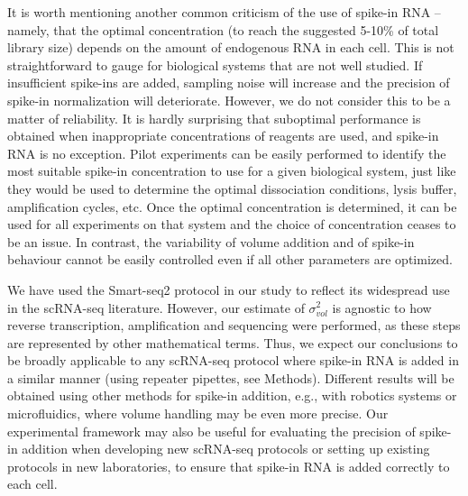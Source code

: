 \documentclass{article}
\begin{document}
It is worth mentioning another common criticism of the use of spike-in RNA -- namely, that the optimal concentration (to reach the suggested 5-10\% of total library size) depends on the amount of endogenous RNA in each cell.
This is not straightforward to gauge for biological systems that are not well studied.
If insufficient spike-ins are added, sampling noise will increase and the precision of spike-in normalization will deteriorate.
However, we do not consider this to be a matter of reliability.
It is hardly surprising that suboptimal performance is obtained when inappropriate concentrations of reagents are used, and spike-in RNA is no exception.
Pilot experiments can be easily performed to identify the most suitable spike-in concentration to use for a given biological system, just like they would be used to determine the optimal dissociation conditions, lysis buffer, amplification cycles, etc.
Once the optimal concentration is determined, it can be used for all experiments on that system and the choice of concentration ceases to be an issue.
In contrast, the variability of volume addition and of spike-in behaviour cannot be easily controlled even if all other parameters are optimized. 

We have used the Smart-seq2 protocol in our study to reflect its widespread use in the scRNA-seq literature.
However, our estimate of $\sigma^2_{vol}$ is agnostic to how reverse transcription, amplification and sequencing were performed, as these steps are represented by other mathematical terms.
Thus, we expect our conclusions to be broadly applicable to any scRNA-seq protocol where spike-in RNA is added in a similar manner (using repeater pipettes, see Methods).
Different results will be obtained using other methods for spike-in addition, e.g., with robotics systems or microfluidics, where volume handling may be even more precise.
Our experimental framework may also be useful for evaluating the precision of spike-in addition when developing new scRNA-seq protocols or setting up existing protocols in new laboratories, to ensure that spike-in RNA is added correctly to each cell.
\end{document}
